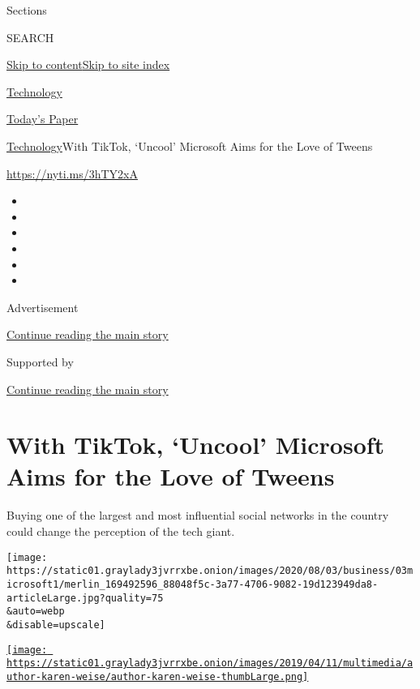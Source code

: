 Sections

SEARCH

\protect\hyperlink{site-content}{Skip to
content}\protect\hyperlink{site-index}{Skip to site index}

\href{https://www.nytimes3xbfgragh.onion/section/technology}{Technology}

\href{https://myaccount.nytimes3xbfgragh.onion/auth/login?response_type=cookie\&client_id=vi}{}

\href{https://www.nytimes3xbfgragh.onion/section/todayspaper}{Today's
Paper}

\href{/section/technology}{Technology}\textbar{}With TikTok, `Uncool'
Microsoft Aims for the Love of Tweens

\url{https://nyti.ms/3hTY2xA}

\begin{itemize}
\item
\item
\item
\item
\item
\item
\end{itemize}

Advertisement

\protect\hyperlink{after-top}{Continue reading the main story}

Supported by

\protect\hyperlink{after-sponsor}{Continue reading the main story}

\hypertarget{with-tiktok-uncool-microsoft-aims-for-the-love-of-tweens}{%
\section{With TikTok, `Uncool' Microsoft Aims for the Love of
Tweens}\label{with-tiktok-uncool-microsoft-aims-for-the-love-of-tweens}}

Buying one of the largest and most influential social networks in the
country could change the perception of the tech giant.

\texttt{[image: https://static01.graylady3jvrrxbe.onion/images/2020/08/03/business/03microsoft1/merlin\_169492596\_88048f5c-3a77-4706-9082-19d123949da8-articleLarge.jpg?quality=75\\\&auto=webp\\\&disable=upscale]}

\href{https://www.nytimes3xbfgragh.onion/by/karen-weise}{\texttt{[image: https://static01.graylady3jvrrxbe.onion/images/2019/04/11/multimedia/author-karen-weise/author-karen-weise-thumbLarge.png]}}

